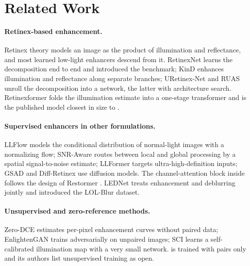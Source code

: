 \section{Related Work}
\label{sec:related}

\paragraph{Retinex-based enhancement.} Retinex theory \citep{land1977retinex} models an
image as the product of illumination and reflectance, and most learned low-light enhancers
descend from it. RetinexNet \citep{wei2018retinex} learns the decomposition end to end and
introduced the \dataset benchmark; KinD \citep{zhang2019kind} enhances illumination and
reflectance along separate branches; URetinex-Net \citep{wu2022uretinex} and RUAS
\citep{liu2021ruas} unroll the decomposition into a network, the latter with architecture
search. Retinexformer \citep{cai2023retinexformer} folds the illumination estimate into a
one-stage transformer and is the published model closest in size to \mname.

\paragraph{Supervised enhancers in other formulations.} LLFlow \citep{wang2022llflow} models
the conditional distribution of normal-light images with a normalizing flow; SNR-Aware
\citep{xu2022snr} routes between local and global processing by a spatial signal-to-noise
estimate; LLFormer \citep{wang2023llformer} targets ultra-high-definition inputs; GSAD
\citep{hou2023gsad} and Diff-Retinex \citep{yi2023diffretinex} use diffusion models. The
channel-attention block inside \mname follows the design of Restormer
\citep{zamir2022restormer}. LEDNet \citep{zhou2022lolblur} treats enhancement and deblurring
jointly and introduced the LOL-Blur dataset.

\paragraph{Unsupervised and zero-reference methods.} Zero-DCE \citep{guo2020zerodce}
estimates per-pixel enhancement curves without paired data; EnlightenGAN
\citep{jiang2021enlightengan} trains adversarially on unpaired images; SCI \citep{ma2022sci}
learns a self-calibrated illumination map with a very small network. \mname is trained with
pairs only and its authors list unsupervised training as open.

